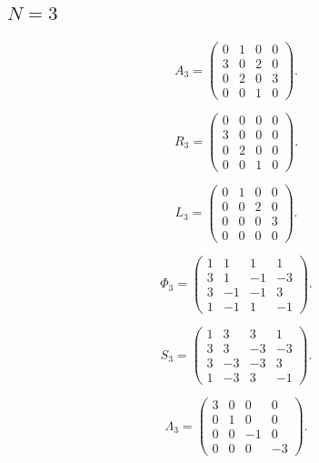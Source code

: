\subsection{$N=3$}
\label{tab:matrices-N03}
\begingroup
\small
\setlength{\arraycolsep}{3pt}
\[
A_{3}=\begin{pmatrix}
0 & 1 & 0 & 0 \\
3 & 0 & 2 & 0 \\
0 & 2 & 0 & 3 \\
0 & 0 & 1 & 0
\end{pmatrix}.
\]
\endgroup

\begingroup
\small
\setlength{\arraycolsep}{3pt}
\[
R_{3}=\begin{pmatrix}
0 & 0 & 0 & 0 \\
3 & 0 & 0 & 0 \\
0 & 2 & 0 & 0 \\
0 & 0 & 1 & 0
\end{pmatrix}.
\]
\endgroup

\begingroup
\small
\setlength{\arraycolsep}{3pt}
\[
L_{3}=\begin{pmatrix}
0 & 1 & 0 & 0 \\
0 & 0 & 2 & 0 \\
0 & 0 & 0 & 3 \\
0 & 0 & 0 & 0
\end{pmatrix}.
\]
\endgroup

\begingroup
\small
\setlength{\arraycolsep}{3pt}
\[
\Phi_{3}=\begin{pmatrix}
1 & 1 & 1 & 1 \\
3 & 1 & -1 & -3 \\
3 & -1 & -1 & 3 \\
1 & -1 & 1 & -1
\end{pmatrix}.
\]
\endgroup

\begingroup
\small
\setlength{\arraycolsep}{3pt}
\[
S_{3}=\begin{pmatrix}
1 & 3 & 3 & 1 \\
3 & 3 & -3 & -3 \\
3 & -3 & -3 & 3 \\
1 & -3 & 3 & -1
\end{pmatrix}.
\]
\endgroup

\begingroup
\small
\setlength{\arraycolsep}{3pt}
\[
\Lambda_{3}=\begin{pmatrix}
3 & 0 & 0 & 0 \\
0 & 1 & 0 & 0 \\
0 & 0 & -1 & 0 \\
0 & 0 & 0 & -3
\end{pmatrix}.
\]
\endgroup

